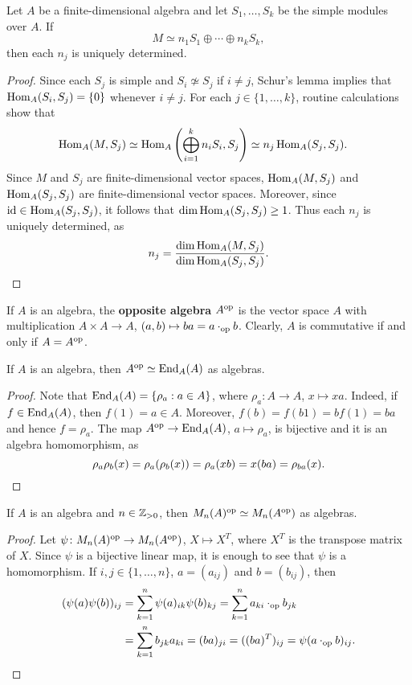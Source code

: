 \begin{theorem}
Let $A$ be a finite-dimensional algebra and let 
$S_1,\dots,S_k$ be the simple modules over $A$. 
If 
\[
M\simeq n_1S_1\oplus\cdots\oplus n_kS_k,
\]
then each $n_j$ is uniquely determined.  
\end{theorem}

\begin{proof}
	Since each $S_j$ is simple and $S_i\not\simeq S_j$ if $i\ne j$, Schur's lemma implies that 
	$\operatorname{Hom}_A(S_i,S_j)=\{0\}$ whenever $i\ne j$. 
	For each $j\in\{1,\dots,k\}$, routine calculations show that 
	\begin{align*}
		\operatorname{Hom}_A(M,S_j) &\simeq \operatorname{Hom}_A\left(\bigoplus_{i=1}^k n_i S_i,S_j\right)
		\simeq n_j\operatorname{Hom}_A(S_j,S_j). 
	\end{align*} 
	Since $M$ and $S_j$ are finite-dimensional vector spaces, $\operatorname{Hom}_A(M,S_j)$ and $\operatorname{Hom}_A(S_j,S_j)$ 
	are finite-dimensional vector spaces.  
	Moreover, since 
	$\operatorname{id}\in\operatorname{Hom}_A(S_j,S_j)$, it follows that 
	$\dim\operatorname{Hom}_A(S_j,S_j)\geq 1$. 
	Thus each $n_j$ is uniquely determined, as  
	\[ 
	n_j=\frac{\dim\operatorname{Hom}_A(M,S_j)}{\dim\operatorname{Hom}_A(S_j,S_j)}.\qedhere
	\]
\end{proof}

If $A$ is an algebra, the \textbf{opposite algebra} $A^{\operatorname{op}}$ is the vector space 
$A$ with multiplication $A\times A\to A$, $(a,b)\mapsto ba=a\cdot_{\operatorname{op}}b$. Clearly,
$A$ is commutative if and only if $A=A^{\operatorname{op}}$. 

\begin{lemma}
	\label{lem:A^op}
    If $A$ is an algebra, then $A^{\operatorname{op}}\simeq\operatorname{End}_A(A)$ as algebras.  
\end{lemma}

\begin{proof}
	Note that $\operatorname{End}_A(A)=\{\rho_a:a\in A\}$, where $\rho_a\colon
	A\to A$, $x\mapsto xa$. Indeed, if $f\in\operatorname{End}_A(A)$, then 
	$f(1)=a\in A$. Moreover, $f(b)=f(b1)=bf(1)=ba$ and hence 
	$f=\rho_a$. The map $A^{\operatorname{op}}\to \operatorname{End}_A(A)$, $a\mapsto\rho_a$, 
	is bijective and it is an algebra homomorphism, as 
    \[
		\rho_a\rho_b(x)=\rho_a(\rho_b(x))=\rho_a(xb)=x(ba)=\rho_{ba}(x).\qedhere
    \]
\end{proof}

\begin{lemma}
	\label{lem:Mn_op}
	If $A$ is an algebra and $n\in\mathbb{Z}_{>0}$, then $M_n(A)^{\operatorname{op}}\simeq
	M_n(A^{\operatorname{op}})$ as algebras.   
\end{lemma}

\begin{proof}
	Let $\psi\colon M_n(A)^{\operatorname{op}}\to M_n(A^{\operatorname{op}})$, $X\mapsto X^T$,
	where $X^T$ is the transpose matrix of $X$. Since $\psi$ is a bijective linear map, it is enough
	to see that $\psi$ is a homomorphism. If $i,j\in\{1,\dots,n\}$, $a=(a_{ij})$ and $b=(b_{ij})$, then 
	\begin{align*}
		(\psi(a)\psi(b))_{ij}&=\sum_{k=1}^n \psi(a)_{ik}\psi(b)_{kj}=\sum_{k=1}^n a_{ki}\cdot_{\operatorname{op}}b_{jk}\\
		&=\sum_{k=1}^n b_{jk}a_{ki}=(ba)_{ji}=((ba)^T)_{ij}=\psi(a\cdot_{\operatorname{op}}b)_{ij}.\qedhere
	\end{align*}
\end{proof}

